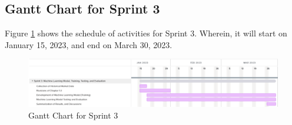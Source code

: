 \subsection{Gantt Chart for Sprint 3}
\label{subsec:gantt_chart_sprint3}
Figure \ref{fig:gantt_chart_sprint3} shows the schedule of activities for Sprint 3. 
Wherein, it will start on January 15, 2023, and end on March 30, 2023.
\begin{figure}[ht]
    \centering
    \includegraphics[width=1\textwidth]{./assets/Gantt_Chart_Sprint3.png}
    \caption{Gantt Chart for Sprint 3}
    \label{fig:gantt_chart_sprint3}
\end{figure}
\FloatBarrier
